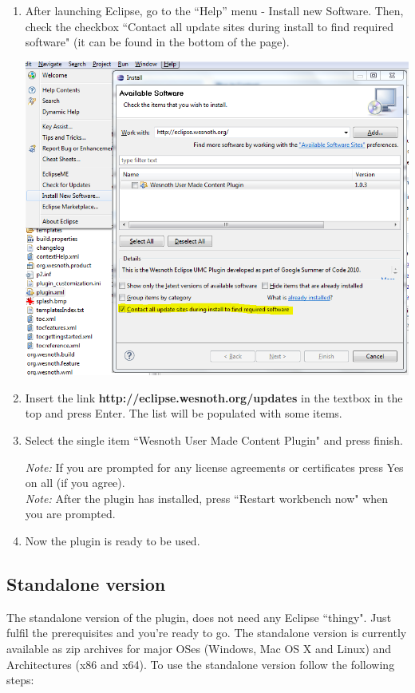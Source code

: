 \documentclass[10pt]{article}
\begin{document}
\begin{enumerate}
\item After launching Eclipse, go to the ``Help'' menu - Install new Software. Then, check the checkbox ``Contact all update sites during install to find required software" (it can be found in the bottom of the page).

\begin{center}
\includegraphics[scale=0.7]{install_new_software.png}
\end{center}

\item Insert the link \textbf{http://eclipse.wesnoth.org/updates} in the textbox in the top and press Enter. The list will be populated with some items.
\item Select the single item ``Wesnoth User Made Content Plugin" and press finish.

\textit{Note:} If you are prompted for any license agreements or certificates press Yes on all (if you agree).\\
\textit{Note:} After the plugin has installed, press ``Restart workbench now" when you are prompted.
\item Now the plugin is ready to be used.
\end{enumerate}

\subsection{Standalone version}
The standalone version of the plugin, does not need any Eclipse ``thingy". Just fulfil the prerequisites and you're ready to go. The standalone version is currently available as zip archives for major OSes (Windows, Mac OS X and Linux) and Architectures (x86 and x64). To use the standalone version follow the following steps:
\end{document}
